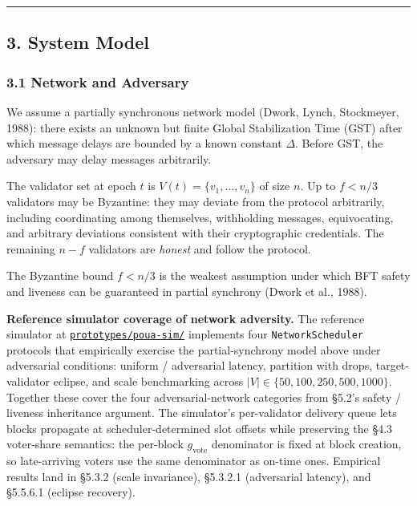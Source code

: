 \documentclass[
  11pt,
]{article}
\begin{document}
\begin{center}\rule{0.5\linewidth}{0.5pt}\end{center}

\subsection{3. System Model}\label{system-model}

\subsubsection{3.1 Network and Adversary}\label{network-and-adversary}

We assume a partially synchronous network model (Dwork, Lynch,
Stockmeyer, 1988): there exists an unknown but finite Global
Stabilization Time (GST) after which message delays are bounded by a
known constant \(\Delta\). Before GST, the adversary may delay messages
arbitrarily.

The validator set at epoch \(t\) is \(V(t) = \{v_1, \ldots, v_n\}\) of
size \(n\). Up to \(f < n/3\) validators may be Byzantine: they may
deviate from the protocol arbitrarily, including coordinating among
themselves, withholding messages, equivocating, and arbitrary deviations
consistent with their cryptographic credentials. The remaining \(n - f\)
validators are \emph{honest} and follow the protocol.

The Byzantine bound \(f < n/3\) is the weakest assumption under which
BFT safety and liveness can be guaranteed in partial synchrony (Dwork et
al., 1988).

\textbf{Reference simulator coverage of network adversity.} The
reference simulator at
\href{https://github.com/ligate-io/ligate-research/tree/main/prototypes/poua-sim}{\texttt{prototypes/poua-sim/}}
implements four \texttt{NetworkScheduler} protocols that empirically
exercise the partial-synchrony model above under adversarial conditions:
uniform / adversarial latency, partition with drops, target-validator
eclipse, and scale benchmarking across
\(|V| \in \{50, 100, 250, 500, 1000\}\). Together these cover the four
adversarial-network categories from §5.2's safety / liveness inheritance
argument. The simulator's per-validator delivery queue lets blocks
propagate at scheduler-determined slot offsets while preserving the §4.3
voter-share semantics: the per-block \(g_{\text{vote}}\) denominator is
fixed at block creation, so late-arriving voters use the same
denominator as on-time ones. Empirical results land in §5.3.2 (scale
invariance), §5.3.2.1 (adversarial latency), and §5.5.6.1 (eclipse
recovery).
\end{document}
